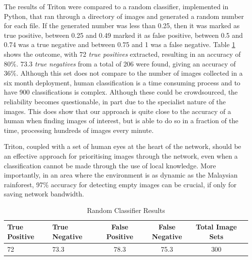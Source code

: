 		The results of Triton were compared to a random classifier, implemented in Python, that ran through a directory of images and generated a random number for each file. If the generated number was less than 0.25, then it was marked as true positive, between 0.25 and 0.49 marked it as false positive, between 0.5 and 0.74 was a true negative and between 0.75 and 1 was a false negative. Table \ref{table:random} shows the outcome, with 72 \textit{true positives} extracted, resulting in an accuracy of 80\%. 73.3 \textit{true negatives} from a total of 206 were found, giving an accuracy of 36\%. Although this set does not compare to the number of images collected in a six month deployment, human classification is a time consuming process and to have 900 classifications is complex. Although these could be crowdsourced, the reliability becomes questionable, in part due to the specialist nature of the images. This does show that our approach is quite close to the accuracy of a human when finding images of interest, but is able to do so in a fraction of the time, processing hundreds of images every minute. 
		
		Triton, coupled with a set of human eyes at the heart of the network, should be an effective approach for prioritising images through the network, even when a classification cannot be made through the use of local knowledge. More importantly, in an area where the environment is as dynamic as the Malaysian rainforest, 97\% accuracy for detecting empty images can be crucial, if only for saving network bandwidth.
		
		\begin{footnotesize}
		\begin{table}
		\centering
			\hfill{}
			\begin{tabular}{|l|l|c|c|c|c|}
				\hline
					True Positive & True Negative & False Positive  & False Negative & Total Image Sets \\
				\hline
					72 & 73.3 & 78.3 & 75.3 & 300 \\
				\hline
			\end{tabular}
			\hfill{}
			\caption{Random Classifier Results}
			\label{table:random}
		\end{table}		
		\end{footnotesize}	
%	

